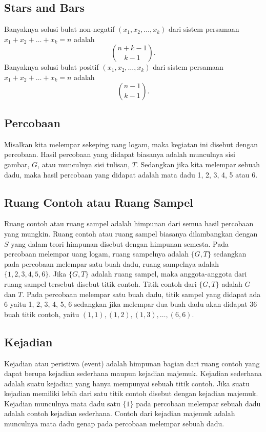 \documentclass[11pt]{scrartcl}
\begin{document}
        \subsection{Stars and Bars}
        Banyaknya solusi bulat non-negatif $(x_1,x_2,\dots,x_k)$ dari sistem persamaan $x_1+x_2+\dots+x_k=n$ adalah
        $${n+k-1 \choose k-1}.$$
        Banyaknya solusi bulat positif $(x_1,x_2,\dots,x_k)$ dari sistem persamaan $x_1+x_2+\dots+x_k=n$ adalah
        $${n-1 \choose k-1}.$$
    
    \subsection{Percobaan}
Misalkan kita melempar sekeping uang logam, maka kegiatan ini disebut dengan percobaan. Hasil 
percobaan yang didapat biasanya adalah munculnya sisi gambar, $G$, atau munculnya sisi tulisan, $T$. 
Sedangkan jika kita melempar sebuah dadu, maka hasil percobaan yang didapat adalah mata dadu 1, 
2, 3, 4, 5 atau 6. 

\subsection{Ruang Contoh atau Ruang Sampel} 
Ruang contoh atau ruang sampel adalah himpunan dari semua hasil percobaan yang mungkin. Ruang 
contoh atau ruang sampel biasanya dilambangkan dengan $S$ yang dalam teori himpunan disebut 
dengan himpunan semesta. 
Pada percobaan melempar uang logam, ruang sampelnya adalah $\{G, T\}$ sedangkan pada percobaan
melempar satu buah dadu, ruang sampelnya adalah $\{1, 2, 3, 4, 5, 6\}$. 
Jika $\{G, T\}$ adalah ruang sampel, maka anggota-anggota dari ruang sampel tersebut disebut titik
contoh. Titik contoh dari $\{G, T\}$ adalah $G$ dan $T$. Pada percobaan melempar satu buah dadu, titik 
sampel yang didapat ada 6 yaitu 1, 2, 3, 4, 5, 6 sedangkan jika melempar dua buah dadu akan didapat
36 buah titik contoh, yaitu $(1, 1), (1, 2), (1, 3), \dots , (6, 6)$. 

\subsection{Kejadian}
Kejadian atau peristiwa (event) adalah himpunan bagian dari ruang contoh yang dapat berupa
kejadian sederhana maupun kejadian majemuk. Kejadian sederhana adalah suatu kejadian yang
hanya mempunyai sebuah titik contoh. Jika suatu kejadian memiliki lebih dari satu titik contoh 
disebut dengan kejadian majemuk. 
Kejadian munculnya mata dadu satu $\{1\}$ pada percobaan melempar sebuah dadu adalah contoh 
kejadian sederhana. Contoh dari kejadian majemuk adalah munculnya mata dadu genap pada 
percobaan melempar sebuah dadu. 
    
\end{document}
